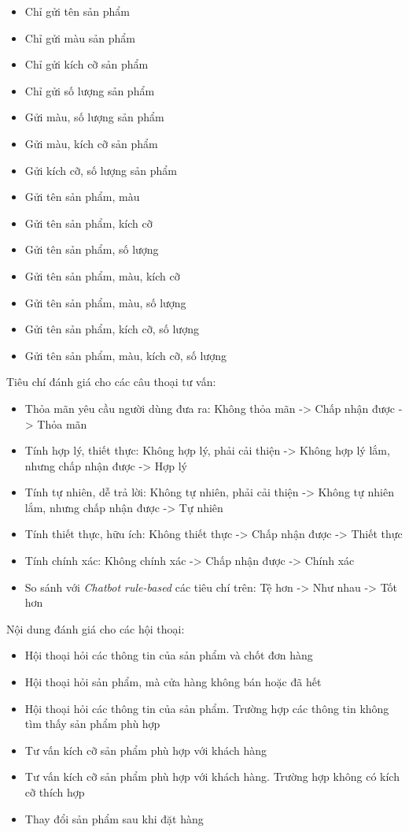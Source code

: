 \begin{itemize}
    \begin{itemize}
        \item Chỉ gửi tên sản phẩm
        \item Chỉ gửi màu sản phẩm
        \item Chỉ gửi kích cỡ sản phẩm
        \item Chỉ gửi số lượng sản phẩm
        \item Gửi màu, số lượng sản phẩm
        \item Gửi màu, kích cỡ sản phẩm
        \item Gửi kích cỡ, số lượng sản phẩm
        \item Gửi tên sản phẩm, màu
        \item Gửi tên sản phẩm, kích cỡ
        \item Gửi tên sản phẩm, số lượng
        \item Gửi tên sản phẩm, màu, kích cỡ
        \item Gửi tên sản phẩm, màu, số lượng
        \item Gửi tên sản phẩm, kích cỡ, số lượng
        \item Gửi tên sản phẩm, màu, kích cỡ, số lượng
    \end{itemize}
\end{itemize}

Tiêu chí đánh giá cho các câu thoại tư vấn:

\begin{itemize}
    \item Thỏa mãn yêu cầu người dùng đưa ra: Không thỏa mãn ->
    Chấp nhận được -> Thỏa mãn
    \item Tính hợp lý, thiết thực: Không hợp lý, phải cải thiện ->
    Không hợp lý lắm, nhưng chấp nhận được -> Hợp lý
    \item Tính tự nhiên, dễ trả lời: Không tự nhiên, phải cải thiện
    -> Không tự nhiên lắm, nhưng chấp nhận được -> Tự nhiên
    \item Tính thiết thực, hữu ích: Không thiết thực -> Chấp nhận
    được -> Thiết thực
    \item Tính chính xác: Không chính xác -> Chấp nhận được ->
    Chính xác
    \item So sánh với \textit{Chatbot rule-based} các tiêu chí trên:
    Tệ hơn -> Như nhau -> Tốt hơn
\end{itemize}

Nội dung đánh giá cho các hội thoại:

\begin{itemize}
    \item Hội thoại hỏi các thông tin của sản phẩm và chốt đơn hàng
    \item Hội thoại hỏi sản phẩm, mà cửa hàng không bán hoặc đã hết
    \item Hội thoại hỏi các thông tin của sản phẩm. Trường hợp các
    thông tin không tìm thấy sản phẩm phù hợp
    \item Tư vấn kích cỡ sản phẩm phù hợp với khách hàng
    \item Tư vấn kích cỡ sản phẩm phù hợp với khách hàng. Trường hợp
    không có kích cỡ thích hợp
    \item Thay đổi sản phẩm sau khi đặt hàng
\end{itemize}

